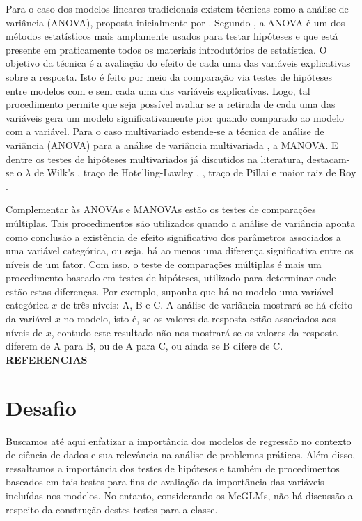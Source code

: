 Para o caso dos modelos lineares tradicionais existem técnicas como a análise de variância (ANOVA), proposta inicialmente por \citet{anova_fisher}. Segundo \citet{anova1}, a ANOVA é um dos métodos estatísticos mais amplamente usados para testar hipóteses e que está presente em praticamente todos os materiais introdutórios de estatística. O objetivo da técnica é a avaliação do efeito de cada uma das variáveis explicativas sobre a resposta. Isto é feito por meio da comparação via testes de hipóteses entre modelos com e sem cada uma das variáveis explicativas. Logo, tal procedimento permite que seja possível avaliar se a retirada de cada uma das variáveis gera um modelo significativamente pior quando comparado ao modelo com a variável. Para o caso multivariado estende-se a técnica de análise de variância (ANOVA) para a análise de variância  multivariada \citep{manova}, a MANOVA. E dentre os testes de hipóteses multivariados já discutidos na literatura, destacam-se o $\lambda$ de Wilk's \citep{wilks}, traço de Hotelling-Lawley \citep{lawley}, \citep{hotelling}, traço de Pillai \citep{pillai} e maior raiz de Roy \citep{roy}. 


Complementar às ANOVAs e MANOVAs estão os testes de comparações múltiplas. Tais procedimentos são utilizados quando a análise de variância aponta como conclusão a existência de efeito significativo dos parâmetros associados a uma variável categórica, ou seja, há ao menos uma diferença significativa entre os níveis de um fator. Com isso, o teste de comparações múltiplas é mais um procedimento baseado em testes de hipóteses, utilizado para determinar onde estão estas diferenças. Por exemplo, suponha que há no modelo uma variável categórica $x$ de três níveis: A, B e C. A análise de variância mostrará se há efeito da variável $x$ no modelo, isto é, se os valores da resposta estão associados aos níveis de $x$, contudo este resultado não nos mostrará se os valores da resposta diferem de A para B, ou de A para C, ou ainda se B difere de C. \textbf{REFERENCIAS}


\section{Desafio}

Buscamos até aqui enfatizar a importância dos modelos de regressão no contexto de ciência de dados e sua relevância na análise de problemas práticos. Além disso, ressaltamos a importância dos testes de hipóteses e também de procedimentos baseados em tais testes para fins de avaliação da importância das variáveis incluídas nos modelos. No entanto, considerando os McGLMs, não há discussão a respeito da construção destes testes para a classe.

